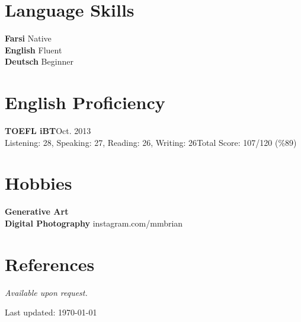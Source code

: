 \documentclass[margin,line]{resume}
\begin{document}
\begin{resume}
     \section{\mysidestyle Language Skills} 
     {\bf Farsi} Native\\
     {\bf English} Fluent\\
     {\bf Deutsch} Beginner\\
    
    
     \section{\mysidestyle English Proficiency} 
     {\bf TOEFL iBT}\vspace{1mm}\hfill {\sf Oct. 2013}\\
    Listening: 28, Speaking: 27, Reading: 26, Writing: 26\vspace{2mm}\hfill {\sf Total Score: 107/120 (\%89)}\\
    
    \section{\mysidestyle Hobbies}
    {\bf Generative Art} \vspace{1mm}\\
    {\bf Digital Photography} \hfill{instagram.com/mmbrian}
    
    \section{\mysidestyle References} 
    {\sl Available upon request.}


\begin{center}
\begin{footnotesize}
Last updated: \today \\
\end{footnotesize}
\end{center}

\end{resume}
\end{document}
